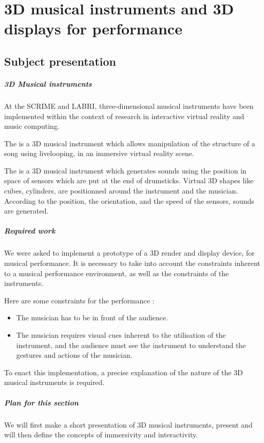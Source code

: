 \chapter{3D musical instruments and 3D displays for performance}
\section{Subject presentation}
\paragraph{3D Musical instruments}
At the \ac{SCRIME} and \ac{LABRI}, three-dimensional musical instruments have been implemented within the context of research in interactive virtual reality and music computing. 

The  \cite{berthaut2010drile} is a 3D musical instrument which allows manipulation of the structure of a song using \gls{livelooping}, in an immersive virtual reality scene.

The  is a 3D musical instrument which generates sounds using the position in space of sensors which are put at the end of drumsticks. Virtual 3D shapes like cubes, cylinders, are positionned around the instrument and the musician. According to the position, the orientation, and the speed of the sensors, sounds are generated.

\paragraph{Required work}
We were asked to implement a prototype of a 3D render and display device, for musical performance.
It is necessary to take into account the constraints inherent to a musical performance environment, as well as the constraints of the instruments.

Here are some constraints for the performance : 
\begin{itemize}
\item The musician has to be in front of the audience.
\item The musician requires visual cues inherent to the utilisation of the instrument, and the audience must see the instrument to understand the gestures and actions of the musician.
\end{itemize}

To enact this implementation, a precise explanation of the nature of the 3D musical instruments is required.

\paragraph{Plan for this section}
We will first make a short presentation of 3D musical instruments, present and will then define the concepts of immersivity and interactivity.

